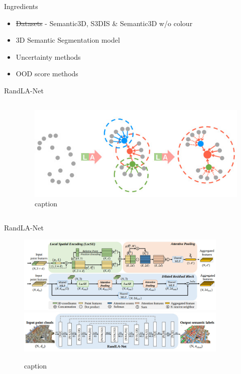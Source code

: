 \documentclass[aspectratio=169]{beamer}
\begin{document}
\begin{frame}{Ingredients}
    \begin{itemize}
        \item \st{Datasets} - Semantic3D, S3DIS \& Semantic3D w/o colour
        \item 3D Semantic Segmentation model
        \item Uncertainty methods
        \item OOD score methods
    \end{itemize}
\end{frame}
\begin{frame}{RandLA-Net}
    \begin{columns}
        \begin{column}{0.6\textwidth}
            
        \end{column}
        \begin{column}{0.4\textwidth}
            \begin{figure}
                \centering
                \includegraphics[scale=0.35]{images/randlanet_dires_effect.jpg}
                \caption{caption}
                \label{fig:dires_effect}
            \end{figure}
        \end{column}
    \end{columns}
    
\end{frame}
\begin{frame}{RandLA-Net}
    \begin{figure}
        \centering
        \includegraphics[width = 0.9\textwidth, height=0.37\textheight]{images/randlanet_dires_block.jpg}
        \includegraphics[width = 0.9\textwidth, height=0.37\textheight]{images/randlanet_model.jpg}
        \caption{caption}
        \label{fig:randla_model}
    \end{figure}
\end{frame}
\end{document}
